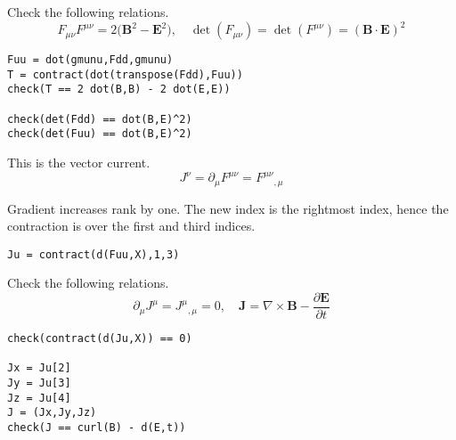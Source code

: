 \documentclass[12pt]{article}
\begin{document}
Check the following relations.
\begin{equation*}
F_{\mu\nu}F^{\mu\nu}=2\bigl(\mathbf B^2-\mathbf E^2\bigl),\quad
\det(F_{\mu\nu})=\det(F^{\mu\nu})=(\mathbf B\cdot\mathbf E)^2
\end{equation*}
{\footnotesize
\begin{verbatim}
Fuu = dot(gmunu,Fdd,gmunu)
T = contract(dot(transpose(Fdd),Fuu))
check(T == 2 dot(B,B) - 2 dot(E,E))

check(det(Fdd) == dot(B,E)^2)
check(det(Fuu) == dot(B,E)^2)
\end{verbatim}}

This is the vector current.
\begin{equation*}
J^\nu
=\partial_\mu F^{\mu\nu}
=F^{\mu\nu}{}_{,\mu}
\end{equation*}

Gradient increases rank by one.
The new index is the rightmost index,
hence the contraction is over the first and third indices.
{\footnotesize
\begin{verbatim}
Ju = contract(d(Fuu,X),1,3)
\end{verbatim}}

Check the following relations.
\begin{equation*}
\partial_\mu J^\mu=J^\mu{}_{,\mu}=0,
\quad\mathbf J=\nabla\times\mathbf B-\frac{\partial\mathbf E}{\partial t}
\end{equation*}
{\footnotesize
\begin{verbatim}
check(contract(d(Ju,X)) == 0)

Jx = Ju[2]
Jy = Ju[3]
Jz = Ju[4]
J = (Jx,Jy,Jz)
check(J == curl(B) - d(E,t))
\end{verbatim}}
\end{document}
